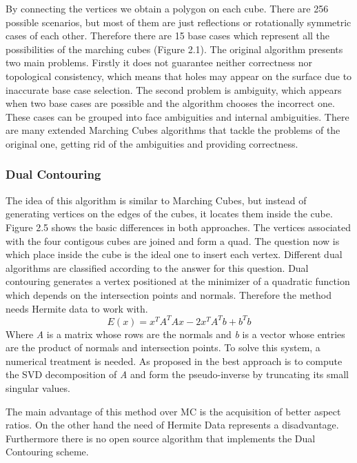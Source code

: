 By connecting the vertices we obtain a polygon on each cube. There are 256 possible scenarios,
but most of them are just reflections or rotationally symmetric cases of each other. Therefore
there are 15 base cases which represent all the possibilities of the marching cubes (Figure 2.1). 
The original algorithm presents two main problems. Firstly it does not guarantee neither
correctness nor topological consistency, which means that holes may appear on the surface due
to inaccurate base case selection. The second problem is ambiguity, which appears when two
base cases are possible and the algorithm chooses the incorrect one. These cases can be grouped
into face ambiguities and internal ambiguities. There are many extended Marching Cubes
algorithms that tackle the problems of the original one, getting rid of the ambiguities and
providing correctness.

\subsubsection{Dual Contouring}
The idea of this algorithm is similar to Marching Cubes, but instead of generating vertices on the
edges of the cubes, it locates them inside the cube. Figure 2.5 shows the basic differences in both approaches.
The vertices associated with the four contigous cubes are joined and form a quad. The question now is
which place inside the cube is the ideal one to insert each vertex. Different dual algorithms are classified 
according to the answer for this question. Dual contouring generates a vertex positioned at the minimizer of a
quadratic function which depends on the intersection points and normals. Therefore the method needs Hermite 
data to work with.
\begin{equation*}
E(x)= x^TA^TAx-2x^TA^Tb+b^Tb
\end{equation*}
Where \textit{A} is a matrix whose rows are the normals and \textit{b} is a vector whose entries are the product of normals and intersection points. To solve this system, a numerical treatment is needed. As proposed in \cite{Hermite2002} the best approach is to compute the
SVD decomposition of \textit{A} and form the pseudo-inverse by truncating its small singular values. 


The main advantage of this method over MC is the acquisition of better aspect ratios. On the other hand the need of Hermite Data
represents a disadvantage. Furthermore there is no open source algorithm that implements the Dual Contouring scheme.


